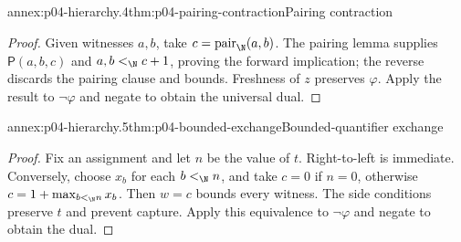 \begin{annexitem}{annex:p04-hierarchy.4}{thm:p04-pairing-contraction}{Pairing contraction}
\begin{proof}
Given witnesses \(a,b\), take \(c=\operatorname{pair}_{\N}(a,b)\).
The pairing lemma supplies \(\mathsf P(a,b,c)\) and \(a,b<_{\N}c+1\), proving the
forward implication; the reverse discards the pairing clause and bounds.
Freshness of \(z\) preserves \(\varphi\).  Apply the result to
\(\neg\varphi\) and negate to obtain the universal dual.
\end{proof}
\end{annexitem}

\begin{annexitem}{annex:p04-hierarchy.5}{thm:p04-bounded-exchange}{Bounded-quantifier exchange}
\begin{proof}
Fix an assignment and let \(n\) be the value of \(t\).  Right-to-left is
immediate.  Conversely, choose \(x_b\) for each \(b<_{\N}n\), and take \(c=0\)
if \(n=0\), otherwise \(c=1+\max_{b<_{\N}n}x_b\).  Then \(w=c\) bounds every
witness.  The side conditions preserve \(t\) and prevent capture.  Apply this
equivalence to \(\neg\varphi\) and negate to obtain the dual.
\end{proof}
\end{annexitem}

